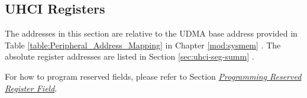 \documentclass[main\_\_EN.tex]{subfiles}
\begin{document}


\subsection{UHCI Registers}

The addresses in this section are relative to the UDMA base address provided in Table \ref{table:Peripheral_Address_Mapping} in Chapter \ref{mod:sysmem} \textit{}. The absolute register addresses are listed in Section \ref{sec:uhci-seg-summ} \textit{}. 

For how to program reserved fields, please refer to Section \hyperref[programming-reserved-field]{\textit{Programming Reserved Register Field}}.


\end{document}
